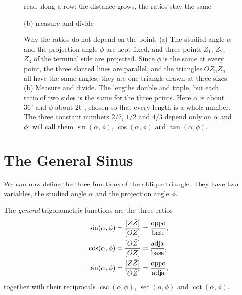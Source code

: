 \begin{figure}[tbp]
\smallskip
{\footnotesize read along a row: the distance grows, the ratios stay the same\par}

\smallskip
{\small (b) measure and divide\par}

\caption[Why the ratios do not depend on the point]{Why the ratios do not depend on the point. (a) The studied angle $\alpha$ and the projection angle $\phi$ are kept fixed, and three points $Z_1$, $Z_2$, $Z_3$ of the terminal side are projected. Since $\phi$ is the same at every point, the three slanted lines are parallel, and the triangles $OZ_n\bar{Z}_n$ all have the same angles: they are one triangle drawn at three sizes. (b) Measure and divide. The lengths double and triple, but each ratio of two sides is the same for the three points. Here $\alpha$ is about $36^\circ$ and $\phi$ about $26^\circ$, chosen so that every length is a whole number. The three constant numbers $2/3$, $1/2$ and $4/3$ depend only on $\alpha$ and $\phi$;  will call them $\sin(\alpha, \phi)$, $\cos(\alpha, \phi)$ and $\tan(\alpha, \phi)$.}
\label{fig:constancy}
\end{figure}


\section{The General Sinus}\label{sec:general-sinus}

We can now define the three functions of the oblique triangle. They have two variables, the studied angle $\alpha$ and the projection angle $\phi$.

\begin{definition}\label{def:general-geometric}
The \emph{general} trigonometric functions are the three ratios
\begin{align*}
\sin(\alpha, \phi) &= \frac{[Z\bar{Z}]}{[OZ]} = \frac{\text{oppo}}{\text{base}}, \\
\cos(\alpha, \phi) &= \frac{[O\bar{Z}]}{[OZ]} = \frac{\text{adja}}{\text{base}}, \\
\tan(\alpha, \phi) &= \frac{[Z\bar{Z}]}{[O\bar{Z}]} = \frac{\text{oppo}}{\text{adja}},
\end{align*}
together with their reciprocals $\csc(\alpha, \phi)$, $\sec(\alpha, \phi)$ and $\cot(\alpha, \phi)$.
\end{definition}

